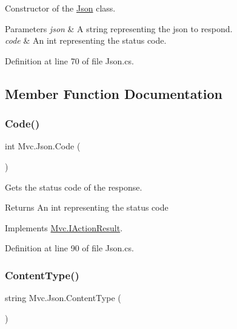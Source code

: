 Constructor of the \hyperlink{class_mvc_1_1_json}{Json} class. 


\begin{DoxyParams}{Parameters}
{\em json} & A string representing the json to respond.\\
\hline
{\em code} & An int representing the status code.\\
\hline
\end{DoxyParams}


Definition at line 70 of file Json.\+cs.



\subsection{Member Function Documentation}
\mbox{\label{class_mvc_1_1_json_aab9ce2b098ce0b4bfe8ad835a33e71d5}} 
\subsubsection{\texorpdfstring{Code()}{Code()}}
{\footnotesize\ttfamily int Mvc.\+Json.\+Code (\begin{DoxyParamCaption}{ }\end{DoxyParamCaption})}



Gets the status code of the response. 

\begin{DoxyReturn}{Returns}
An int representing the status code
\end{DoxyReturn}


Implements \hyperlink{interface_mvc_1_1_i_action_result_ab6b85ae50597587395df99b972c3d26b}{Mvc.\+I\+Action\+Result}.



Definition at line 90 of file Json.\+cs.

\mbox{\label{class_mvc_1_1_json_aa2572df4640e171276244cbb14070284}} 
\subsubsection{\texorpdfstring{Content\+Type()}{ContentType()}}
{\footnotesize\ttfamily string Mvc.\+Json.\+Content\+Type (\begin{DoxyParamCaption}{ }\end{DoxyParamCaption})}



